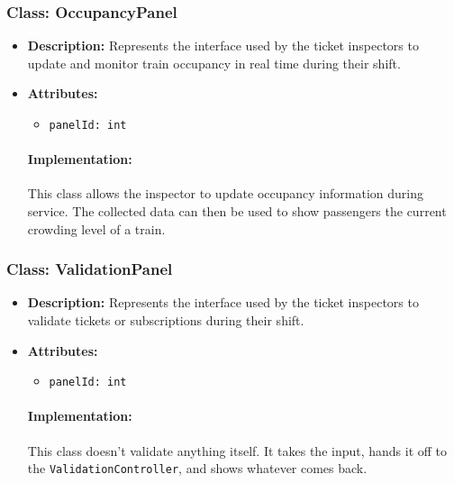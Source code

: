 \documentclass{article}
\begin{document}
\subsubsection*{Class: OccupancyPanel}
\begin{itemize}
    \item \textbf{Description:} Represents the interface used by the ticket inspectors to update and monitor train occupancy in real time during their shift.
    \item \textbf{Attributes:}
    \begin{itemize}
        \item \texttt{panelId: int}
    \end{itemize}
\paragraph{Implementation:} This class allows the inspector to update occupancy information during service. The collected data can then be used to show passengers the current crowding level of a train.
\end{itemize}

\subsubsection*{Class: ValidationPanel}
\begin{itemize}
    \item \textbf{Description:} Represents the interface used by the ticket inspectors to validate tickets or subscriptions during their shift.
    \item \textbf{Attributes:}
    \begin{itemize}
        \item \texttt{panelId: int}
    \end{itemize}
\paragraph{Implementation:} This class doesn't validate anything itself. It takes the input, hands it off to the \texttt{ValidationController}, and shows whatever comes back. 
\end{itemize}
\end{document}
